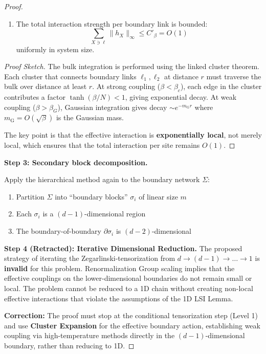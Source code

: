 \begin{proof}
\begin{lemma}
\begin{enumerate}[label=(\roman*)]
\item The total interaction strength per boundary link is bounded:
\[
\sum_{X \ni \ell} \|h_X\|_\infty \leq C'_\beta = O(1)
\]
uniformly in system size.
\end{enumerate}
\end{lemma}

\begin{proof}[Proof Sketch]
The bulk integration is performed using the linked cluster theorem. Each cluster 
that connects boundary links $\ell_1, \ell_2$ at distance $r$ must traverse the 
bulk over distance at least $r$. At strong coupling ($\beta < \beta_c$), each 
edge in the cluster contributes a factor $\tanh(\beta/N) < 1$, giving exponential 
decay. At weak coupling ($\beta > \beta_G$), Gaussian integration gives decay 
$\sim e^{-m_{\mathrm{G}}r}$ where $m_{\mathrm{G}} = O(\sqrt{\beta})$ is the Gaussian mass.

The key point is that the effective interaction is \textbf{exponentially local}, 
not merely local, which ensures that the total interaction per site remains $O(1)$.
\end{proof}

\textbf{Step 3: Secondary block decomposition.}

Apply the hierarchical method again to the boundary network $\Sigma$:
\begin{enumerate}
\item Partition $\Sigma$ into ``boundary blocks'' $\sigma_i$ of linear size $m$
\item Each $\sigma_i$ is a $(d-1)$-dimensional region
\item The boundary-of-boundary $\partial \sigma_i$ is $(d-2)$-dimensional
\end{enumerate}

\textbf{Step 4 (Retracted): Iterative Dimensional Reduction.}
The proposed strategy of iterating the Zegarlinski-tensorization from $d \to (d-1) \to \dots \to 1$ is \textbf{invalid} for this problem.
Renormalization Group scaling implies that the effective couplings on the lower-dimensional boundaries do not remain small or local. The problem cannot be reduced to a 1D chain without creating non-local effective interactions that violate the assumptions of the 1D LSI Lemma.

\textbf{Correction:} The proof must stop at the conditional tensorization step (Level 1) and use \textbf{Cluster Expansion} for the effective boundary action, establishing weak coupling via high-temperature methods directly in the $(d-1)$-dimensional boundary, rather than reducing to 1D.


\end{proof}

